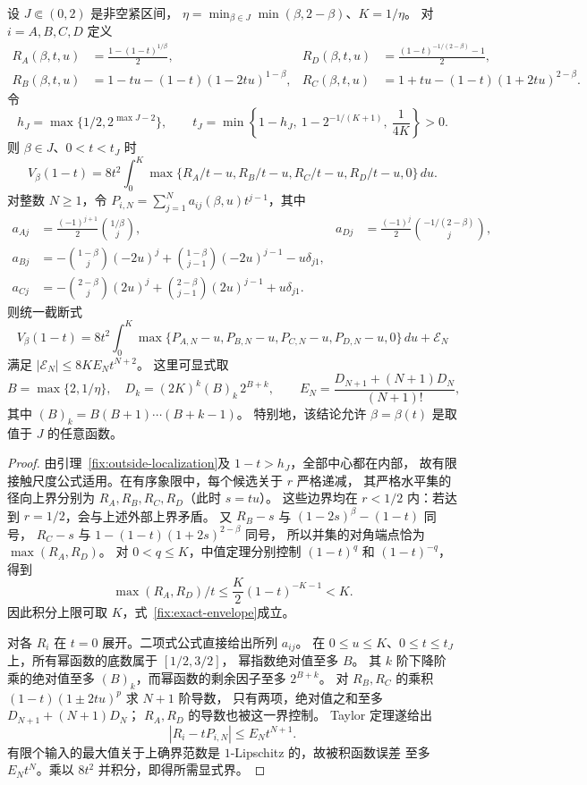 \begin{theorem}[任意阶边界截断]\label{fix:all-order-envelope}
设 $J\Subset(0,2)$ 是非空紧区间，
$\eta=\min_{\beta\in J}\min(\beta,2-\beta)$、$K=1/\eta$。
对 $i=A,B,C,D$ 定义
\begin{align*}
 R_A(\beta,t,u)&=\frac{1-(1-t)^{1/\beta}}2,&
 R_D(\beta,t,u)&=\frac{(1-t)^{-1/(2-\beta)}-1}2,\\
 R_B(\beta,t,u)&=1-tu-(1-t)(1-2tu)^{1-\beta},&
 R_C(\beta,t,u)&=1+tu-(1-t)(1+2tu)^{2-\beta}.
\end{align*}
令
\[
 h_J=\max\{1/2,2^{\max J-2}\},\qquad
 t_J=\min\left\{1-h_J,\ 1-2^{-1/(K+1)},\ \frac1{4K}\right\}>0.
\]
则 $\beta\in J$、$0<t<t_J$ 时
\begin{equation}\label{fix:exact-envelope}
 V_\beta(1-t)=8t^2\int_0^K
 \max\{R_A/t-u,R_B/t-u,R_C/t-u,R_D/t-u,0\}\,du.
\end{equation}
对整数 $N\ge1$，令 $P_{i,N}=\sum_{j=1}^Na_{ij}(\beta,u)t^{j-1}$，其中
\begin{align*}
 a_{Aj}&=\frac{(-1)^{j+1}}2\binom{1/\beta}{j},&
 a_{Dj}&=\frac{(-1)^j}2\binom{-1/(2-\beta)}{j},\\
 a_{Bj}&=-\binom{1-\beta}{j}(-2u)^j
       +\binom{1-\beta}{j-1}(-2u)^{j-1}-u\delta_{j1},\\
 a_{Cj}&=-\binom{2-\beta}{j}(2u)^j
       +\binom{2-\beta}{j-1}(2u)^{j-1}+u\delta_{j1}.
\end{align*}
则统一截断式
\begin{equation}\label{fix:truncated-envelope}
 V_\beta(1-t)=8t^2\int_0^K
 \max\{P_{A,N}-u,P_{B,N}-u,P_{C,N}-u,P_{D,N}-u,0\}\,du
 +\mathcal E_N
\end{equation}
满足 $|\mathcal E_N|\le8K E_Nt^{N+2}$。
这里可显式取
\[
 B=\max\{2,1/\eta\},\quad
 D_k=(2K)^k(B)_k\,2^{B+k},\qquad
 E_N=\frac{D_{N+1}+(N+1)D_N}{(N+1)!},
\]
其中 $(B)_k=B(B+1)\cdots(B+k-1)$。
特别地，该结论允许 $\beta=\beta(t)$ 是取值于 $J$ 的任意函数。
\end{theorem}
\begin{proof}
由引理~\ref{fix:outside-localization}及 $1-t>h_J$，全部中心都在内部，
故有限接触尺度公式适用。在有序象限中，每个候选关于 $r$ 严格递减，
其严格水平集的径向上界分别为 $R_A,R_B,R_C,R_D$（此时 $s=tu$）。
这些边界均在 $r<1/2$ 内：若达到 $r=1/2$，会与上述外部上界矛盾。
又 $R_B-s$ 与 $(1-2s)^\beta-(1-t)$ 同号，
$R_C-s$ 与 $1-(1-t)(1+2s)^{2-\beta}$ 同号，
所以并集的对角端点恰为 $\max(R_A,R_D)$。
对 $0<q\le K$，中值定理分别控制 $(1-t)^q$ 和 $(1-t)^{-q}$，得到
\[
 \max(R_A,R_D)/t\le \frac K2(1-t)^{-K-1}<K.
\]
因此积分上限可取 $K$，式~\eqref{fix:exact-envelope}成立。

对各 $R_i$ 在 $t=0$ 展开。二项式公式直接给出所列 $a_{ij}$。
在 $0\le u\le K$、$0\le t\le t_J$ 上，所有幂函数的底数属于 $[1/2,3/2]$，
幂指数绝对值至多 $B$。
其 $k$ 阶下降阶乘的绝对值至多 $(B)_k$，而幂函数的剩余因子至多 $2^{B+k}$。
对 $R_B,R_C$ 的乘积 $(1-t)(1\pm2tu)^p$ 求 $N+1$ 阶导数，
只有两项，绝对值之和至多 $D_{N+1}+(N+1)D_N$；
$R_A,R_D$ 的导数也被这一界控制。
Taylor 定理遂给出
\[
 |R_i-tP_{i,N}|\le E_Nt^{N+1}.
\]
有限个输入的最大值关于上确界范数是 $1$-Lipschitz 的，故被积函数误差
至多 $E_Nt^N$。乘以 $8t^2$ 并积分，即得所需显式界。
\end{proof}


